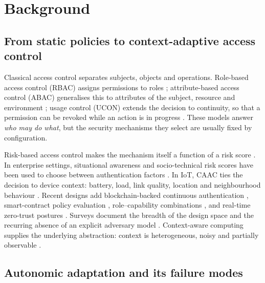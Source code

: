 \section{Background}
\label{sec:background}

\subsection{From static policies to context-adaptive access control}

Classical access control separates subjects, objects and operations. Role-based
access control (RBAC) assigns permissions to roles \cite{sandhu1996role};
attribute-based access control (ABAC) generalises this to attributes of the
subject, resource and environment \cite{hu2014guide}; usage control (UCON)
extends the decision to continuity, so that a permission can be revoked while an
action is in progress \cite{park2004ucon}. These models answer \emph{who may do
what}, but the security mechanisms they select are usually fixed by
configuration.

Risk-based access control makes the mechanism itself a function of a risk score
\cite{atlam2017overview,rath2017adaptive}. In enterprise settings, situational
awareness and socio-technical risk scores have been used to choose between
authentication factors \cite{lee2017situational,moura2017sotraace}. In IoT, CAAC
ties the decision to device context: battery, load, link quality, location and
neighbourhood behaviour \cite{genc2019context,arfaoui2019context}. Recent designs
add blockchain-backed continuous authentication \cite{hussainalnaji2022cab},
smart-contract policy evaluation \cite{merlec2024sc}, role--capability
combinations \cite{krishnasrija2025dynamic}, and real-time zero-trust postures
\cite{stodt2025beyond,federici2023zero}. Surveys document the breadth of the
design space and the recurring absence of an explicit adversary model
\cite{ravidas2019access,qiu2020survey,elhajj2019survey}. Context-aware computing
supplies the underlying abstraction: context is heterogeneous, noisy and
partially observable \cite{piccialli2021context}.

\subsection{Autonomic adaptation and its failure modes}

